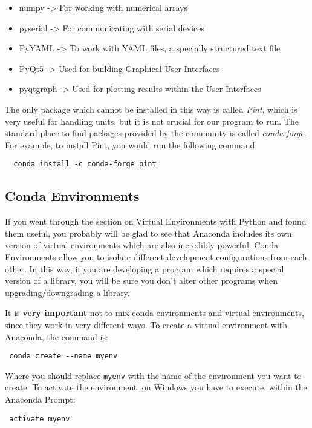 \begin{itemize}
 \item numpy -> For working with numerical arrays
 \item pyserial -> For communicating with serial devices
 \item PyYAML -> To work with YAML files, a specially structured text file
 \item PyQt5 -> Used for building Graphical User Interfaces
 \item pyqtgraph -> Used for plotting results within the User Interfaces
\end{itemize}

The only package which cannot be installed in this way is called \emph{Pint}, which is very useful for handling units, but it is not crucial for our program to run. The standard place to find packages provided by the community is called \emph{conda-forge}. For example, to install Pint, you would run the following command:

\begin{verbatim}
  conda install -c conda-forge pint
\end{verbatim}

\subsection{Conda Environments}
If you went through the section on Virtual Environments with Python and found them useful, you probably will be glad to see that Anaconda includes its own version of virtual environments which are also incredibly powerful. Conda Environments allow you to isolate different development configurations from each other. In this way, if you are developing a program which requires a special version of a library, you will be sure you don't alter other programs when upgrading/downgrading a library. 

It is \textbf{very important} not to mix conda environments and virtual environments, since they work in very different ways. To create a virtual environment with Anaconda, the command is:
\begin{verbatim}
 conda create --name myenv
\end{verbatim}

Where you should replace \texttt{myenv} with the name of the environment you want to create. To activate the environment, on Windows you have to execute, within the Anaconda Prompt:
\begin{verbatim}
 activate myenv
\end{verbatim}

